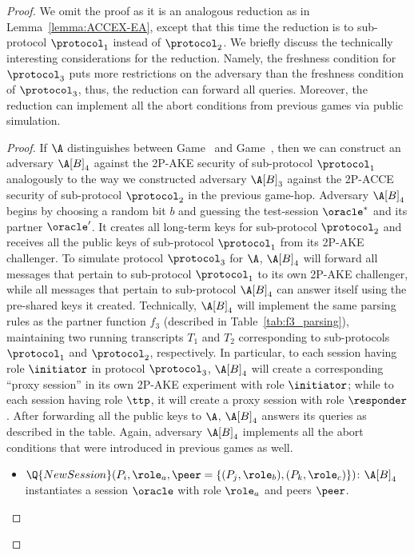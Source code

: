 \begin{proof}
We omit the proof as it is an analogous reduction as in Lemma~\ref{lemma:ACCEX-EA}, except that this time the reduction is to sub-protocol $\protocol_1$ instead of $\protocol_2$.
We briefly discuss the technically interesting considerations for the reduction. Namely, the \AKEm freshness condition for $\protocol_3$ puts more restrictions on the adversary than the freshness condition of $\protocol_3$, thus, the reduction can forward all queries. Moreover, the reduction can implement all the abort conditions from previous games via public simulation.

\iffalse
\begin{proof}
If $\A$ distinguishes between Game~\prevgame{} and Game~\game{},
then we can construct an adversary $\A[B]_4$ against the 2P-AKE security of sub-protocol $\protocol_1$ analogously to the way we constructed adversary $\A[B]_3$ against the 2P-ACCE security of sub-protocol $\protocol_2$ in the previous game-hop. 
%
Adversary $\A[B]_4$ begins by choosing a random bit $b$ and guessing the test-session $\oracle^*$ and its partner $\oracle'$.
It creates all long-term keys for sub-protocol $\protocol_2$ and  receives all the public keys of sub-protocol $\protocol_1$ from its 2P-AKE challenger. 
To simulate protocol $\protocol_3$ for $\A$,
$\A[B]_4$ will forward all messages that pertain to sub-protocol $\protocol_1$ to its own 2P-AKE challenger,
while all messages that pertain to sub-protocol $\A[B]_4$ can answer itself using the pre-shared keys it created. 
Technically, $\A[B]_4$ will implement the same parsing rules as the partner function $f_3$
(described in Table~\ref{tab:f3_parsing}),
maintaining two running transcripts $T_1$ and $T_2$ corresponding to sub-protocols $\protocol_1$ and $\protocol_2$,
respectively. 
In particular, 
to each session having role $\initiator$ in protocol $\protocol_3$,
$\A[B]_4$ will create a corresponding ``proxy session'' in its own 2P-AKE experiment with role $\initiator$;
while to each session having role $\ttp$,
it will create a proxy session with role $\responder$. After forwarding all the public keys to $\A$, $\A[B]_4$ answers its queries as described in the table.
Again, adversary $\A[B]_4$ implements all the abort conditions that were introduced in previous games as well.

\begin{itemize}
	\item $\Q{NewSession}(P_i, \role_a, \peer = \lbrace (P_j, \role_b), (P_k, \role_c) \rbrace)$: 
	$\A[B]_4$ instantiates a session $\oracle$	with role $\role_a$ and peers $\peer$.
	

\end{itemize}
\end{proof}
\end{proof}
